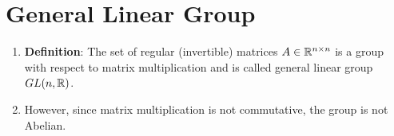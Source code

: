 \section{General Linear Group}

\begin{enumerate}
    \item \textbf{Definition}: The set of regular (invertible) matrices $A \in \mathbb{R}^{n\times n}$ is a group with respect to matrix multiplication and is called general linear group $GL(n, \mathbb{R})$.

    \item However, since matrix multiplication is not commutative, the group is not Abelian.


\end{enumerate}

